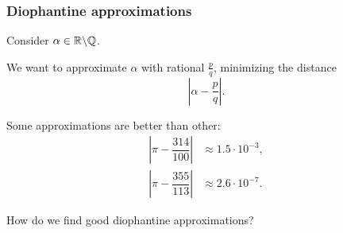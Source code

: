 \begin{frame}
\frametitle{Diophantine approximations}

Consider $\alpha \in \mathbb{R} \backslash \mathbb{Q}$.

We want to approximate $\alpha$ with rational $\frac{p}{q}$, minimizing the distance
\begin{equation*}
	\left|
		\alpha - \dfrac{p}{q}
	\right|.
\end{equation*}

Some approximations are better than other:
\begin{equation*}
	\begin{aligned}
		\left|
			\pi - \dfrac{314}{100}
		\right| & \approx 1.5 \cdot 10^{-3},\\
		\left|
			\pi - \dfrac{355}{113}
		\right| & \approx 2.6 \cdot 10^{-7}.		
	\end{aligned}
\end{equation*}

How do we find good diophantine approximations?

\end{frame}
